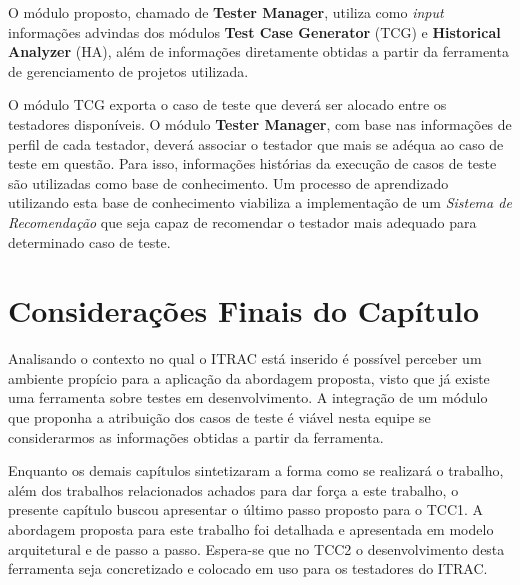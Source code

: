 O módulo proposto, chamado de \textbf{Tester Manager}, utiliza como \textit{input} informações advindas dos módulos \textbf{Test Case Generator} (TCG) e \textbf{Historical Analyzer} (HA), além de informações diretamente obtidas a partir da ferramenta de gerenciamento de projetos utilizada.

O módulo TCG exporta o caso de teste que deverá ser alocado entre os testadores disponíveis. O módulo \textbf{Tester Manager}, com base nas informações de perfil de cada testador, deverá associar o testador que mais se adéqua ao caso de teste em questão. Para isso, informações histórias da execução de casos de teste são utilizadas como base de conhecimento. Um processo de aprendizado utilizando esta base de conhecimento viabiliza a implementação de um \textit{Sistema de Recomendação} que seja capaz de recomendar o testador mais adequado para determinado caso de teste.

\section{Considerações Finais do Capítulo}

Analisando o contexto no qual o ITRAC está inserido é possível perceber um ambiente propício para a aplicação da abordagem proposta, visto que já existe uma ferramenta sobre testes em desenvolvimento. A integração de um módulo que proponha a atribuição dos casos de teste é viável nesta equipe se considerarmos as informações obtidas a partir da ferramenta.

Enquanto os demais capítulos sintetizaram a forma como se realizará o trabalho, além dos trabalhos relacionados achados para dar força a este trabalho, o presente capítulo buscou apresentar o último passo proposto para o TCC1. A abordagem proposta para este trabalho foi detalhada e apresentada em modelo arquitetural e de passo a passo. Espera-se que no TCC2 o desenvolvimento desta ferramenta seja concretizado e colocado em uso para os testadores do ITRAC.
